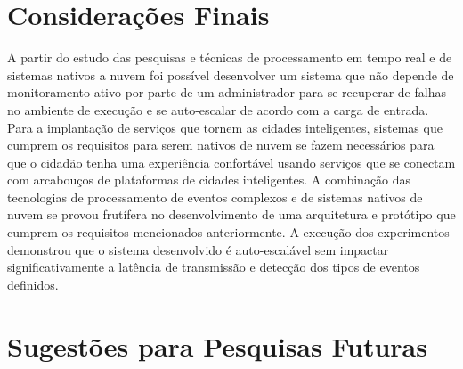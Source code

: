 







\section{Considerações Finais} 

A partir do estudo das pesquisas e técnicas de processamento em tempo real e de sistemas nativos a nuvem foi possível desenvolver um sistema que não depende de monitoramento ativo por parte de um administrador para se recuperar de falhas no ambiente de execução e se auto-escalar de acordo com a carga de entrada. Para a implantação de serviços que tornem as cidades inteligentes, sistemas que cumprem os requisitos para serem nativos de nuvem se fazem necessários para que o cidadão tenha uma experiência confortável usando serviços que se conectam com arcabouços de plataformas de cidades inteligentes. A combinação das tecnologias de processamento de eventos complexos e de sistemas nativos de nuvem se provou frutífera no desenvolvimento de uma arquitetura e protótipo que cumprem os requisitos mencionados anteriormente. A execução dos experimentos demonstrou que o sistema desenvolvido é auto-escalável sem impactar significativamente a latência de transmissão e detecção dos tipos de eventos definidos.









\section{Sugestões para Pesquisas Futuras} 

